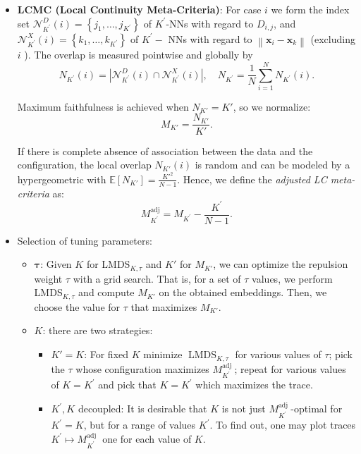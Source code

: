 \documentclass[a4paper,12pt]{article}
\begin{document}
\begin{itemize}
    \item \textbf{LCMC (Local Continuity Meta-Criteria)}: For case $i$ we form the index set $\mathcal{N}_{K^{\prime}}^D(i)=\left\{j_1, \ldots, j_{K^{\prime}}\right\}$ of $K^{\prime}$-NNs with regard to $D_{i, j}$, and $\mathcal{N}_{K^{\prime}}^X(i)=\left\{k_1, \ldots, k_{K^{\prime}}\right\}$ of $K^{\prime}-$ NNs with regard to $\left\|\mathbf{x}_i-\mathbf{x}_k\right\|$ (excluding $i$ ). The overlap is measured pointwise and globally by
    $$
    N_{K^{\prime}}(i)=\left|\mathcal{N}_{K^{\prime}}^D(i) \cap \mathcal{N}_{K^{\prime}}^X(i)\right|, \quad N_{K^{\prime}}=\frac{1}{N} \sum_{i=1}^N N_{K^{\prime}}(i).
    $$

    Maximum faithfulness is achieved when $N_{K'} = K'$, so we normalize:
    $$
    M_{K'} = \frac{N_{K'}}{K'}.
    $$

    If there is complete absence of association between the data and the configuration, the local overlap $N_{K'}(i)$ is random and can be modeled by a hypergeometric with $\mathbb{E}[N_{K'}] = \frac{K'^2}{N-1}$. Hence, we define the \textit{adjusted LC meta-criteria} as:
    $$
    M_{K^{\prime}}^{\mathrm{adj}}=M_{K^{\prime}}-\frac{K^{\prime}}{N-1} .
    $$

    \item Selection of tuning parameters:
    \begin{itemize}
        \item $\mathbf{\tau}$: Given $K$ for LMDS$_{K,\tau}$ and $K'$ for $M_{K'}$, we can optimize the repulsion weight $\tau$ with a grid search. That is, for a set of $\tau$ values, we perform LMDS$_{K,\tau}$ and compute $M_{K'}$ on the obtained embeddings. Then, we choose the value for $\tau$ that maximizes $M_{K'}$.
        \item $K$: there are two strategies:
        \begin{itemize}
            \item $K'=K$: For fixed $K$ minimize $\operatorname{LMDS}_{K, \tau}$ for various values of $\tau$; pick the $\tau$ whose configuration maximizes $M_{K^{\prime}}^{\text {adj }}$; repeat for various values of $K=K^{\prime}$ and pick that $K=K^{\prime}$ which maximizes the trace.
            \item $K^{\prime}, K$ decoupled: It is desirable that $K$ is not just $M_{K^{\prime}}^{\text {adj }}$-optimal for $K^{\prime}=K$, but for a range of values $K^{\prime}$. To find out, one may plot traces $K^{\prime} \mapsto M_{K^{\prime}}^{\text {adj }}$ one for each value of $K$.
        \end{itemize}
    \end{itemize}


\end{itemize}
\end{document}
